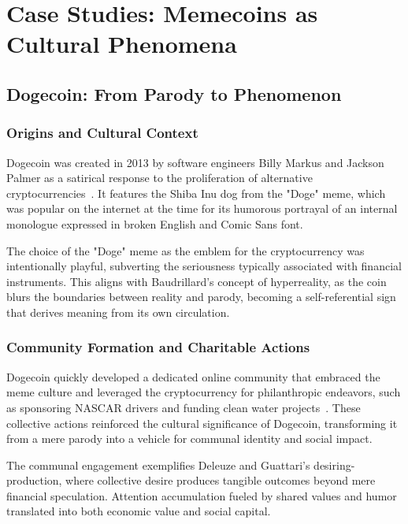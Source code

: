 \documentclass[a4paper,12pt]{article}
\begin{document}
\section{Case Studies: Memecoins as Cultural Phenomena}

\subsection{Dogecoin: From Parody to Phenomenon}

\subsubsection{Origins and Cultural Context}

Dogecoin was created in 2013 by software engineers Billy Markus and Jackson Palmer as a satirical response to the proliferation of alternative cryptocurrencies~\cite{higgins2018dogecoin}. It features the Shiba Inu dog from the "Doge" meme, which was popular on the internet at the time for its humorous portrayal of an internal monologue expressed in broken English and Comic Sans font.

The choice of the "Doge" meme as the emblem for the cryptocurrency was intentionally playful, subverting the seriousness typically associated with financial instruments. This aligns with Baudrillard's concept of hyperreality, as the coin blurs the boundaries between reality and parody, becoming a self-referential sign that derives meaning from its own circulation.

\subsubsection{Community Formation and Charitable Actions}

Dogecoin quickly developed a dedicated online community that embraced the meme culture and leveraged the cryptocurrency for philanthropic endeavors, such as sponsoring NASCAR drivers and funding clean water projects~\cite{ryan2018dogecoin}. These collective actions reinforced the cultural significance of Dogecoin, transforming it from a mere parody into a vehicle for communal identity and social impact.

The communal engagement exemplifies Deleuze and Guattari's desiring-production, where collective desire produces tangible outcomes beyond mere financial speculation. Attention accumulation fueled by shared values and humor translated into both economic value and social capital.
\end{document}
